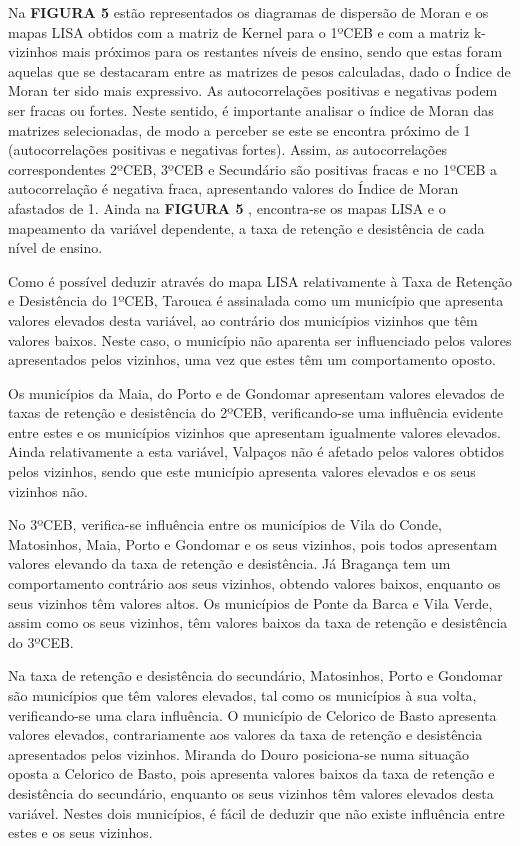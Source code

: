 \documentclass[
]{book}
\begin{document}
Na \textbf{FIGURA 5} estão representados os diagramas de dispersão de Moran e os mapas LISA obtidos com a matriz de Kernel para o 1ºCEB e com a matriz k-vizinhos mais próximos para os restantes níveis de ensino, sendo que estas foram aquelas que se destacaram entre as matrizes de pesos calculadas, dado o Índice de Moran ter sido mais expressivo. As autocorrelações positivas e negativas podem ser fracas ou fortes. Neste sentido, é importante analisar o índice de Moran das matrizes selecionadas, de modo a perceber se este se encontra próximo de 1 (autocorrelações positivas e negativas fortes). Assim, as autocorrelações correspondentes 2ºCEB, 3ºCEB e Secundário são positivas fracas e no 1ºCEB a autocorrelação é negativa fraca, apresentando valores do Índice de Moran afastados de 1. Ainda na \textbf{FIGURA 5} , encontra-se os mapas LISA e o mapeamento da variável dependente, a taxa de retenção e desistência de cada nível de ensino.

Como é possível deduzir através do mapa LISA relativamente à Taxa de Retenção e Desistência do 1ºCEB, Tarouca é assinalada como um município que apresenta valores elevados desta variável, ao contrário dos municípios vizinhos que têm valores baixos. Neste caso, o município não aparenta ser influenciado pelos valores apresentados pelos vizinhos, uma vez que estes têm um comportamento oposto.

Os municípios da Maia, do Porto e de Gondomar apresentam valores elevados de taxas de retenção e desistência do 2ºCEB, verificando-se uma influência evidente entre estes e os municípios vizinhos que apresentam igualmente valores elevados. Ainda relativamente a esta variável, Valpaços não é afetado pelos valores obtidos pelos vizinhos, sendo que este município apresenta valores elevados e os seus vizinhos não.

No 3ºCEB, verifica-se influência entre os municípios de Vila do Conde, Matosinhos, Maia, Porto e Gondomar e os seus vizinhos, pois todos apresentam valores elevando da taxa de retenção e desistência. Já Bragança tem um comportamento contrário aos seus vizinhos, obtendo valores baixos, enquanto os seus vizinhos têm valores altos. Os municípios de Ponte da Barca e Vila Verde, assim como os seus vizinhos, têm valores baixos da taxa de retenção e desistência do 3ºCEB.

Na taxa de retenção e desistência do secundário, Matosinhos, Porto e Gondomar são municípios que têm valores elevados, tal como os municípios à sua volta, verificando-se uma clara influência. O município de Celorico de Basto apresenta valores elevados, contrariamente aos valores da taxa de retenção e desistência apresentados pelos vizinhos. Miranda do Douro posiciona-se numa situação oposta a Celorico de Basto, pois apresenta valores baixos da taxa de retenção e desistência do secundário, enquanto os seus vizinhos têm valores elevados desta variável. Nestes dois municípios, é fácil de deduzir que não existe influência entre estes e os seus vizinhos.
\end{document}
